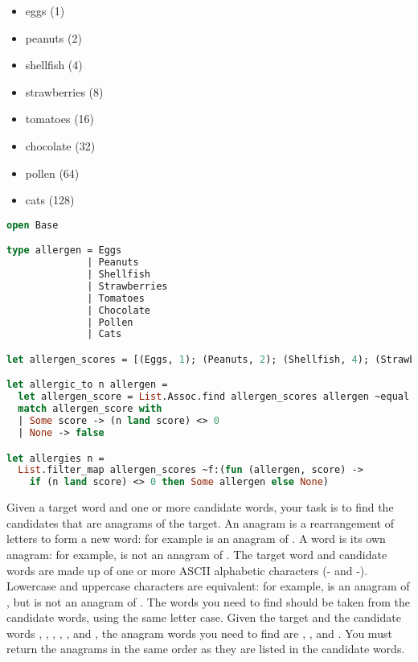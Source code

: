 \begin{itemize}
  \item eggs (1)
  \item peanuts (2)
  \item shellfish (4)
  \item strawberries (8)
  \item tomatoes (16)
  \item chocolate (32)
  \item pollen (64)
  \item cats (128)
\end{itemize}

\begin{lstlisting}[language=OCaml]
open Base

type allergen = Eggs
              | Peanuts
              | Shellfish
              | Strawberries
              | Tomatoes
              | Chocolate
              | Pollen
              | Cats

let allergen_scores = [(Eggs, 1); (Peanuts, 2); (Shellfish, 4); (Strawberries, 8); (Tomatoes, 16); (Chocolate, 32); (Pollen, 64); (Cats, 128)]

let allergic_to n allergen =
  let allergen_score = List.Assoc.find allergen_scores allergen ~equal:Poly.equal in
  match allergen_score with
  | Some score -> (n land score) <> 0
  | None -> false

let allergies n =
  List.filter_map allergen_scores ~f:(fun (allergen, score) ->
    if (n land score) <> 0 then Some allergen else None)
\end{lstlisting}

Given a target word and one or more candidate words, your task is to find the candidates that are anagrams of the target.
An anagram is a rearrangement of letters to form a new word: for example  is an anagram of .
A word is  its own anagram: for example,  is not an anagram of .
The target word and candidate words are made up of one or more ASCII alphabetic characters (- and -).
Lowercase and uppercase characters are equivalent: for example,  is an anagram of , but  is not an anagram of .
The words you need to find should be taken from the candidate words, using the same letter case.
Given the target  and the candidate words , , , , , and , the anagram words you need to find are , , and .
You must return the anagrams in the same order as they are listed in the candidate words.

